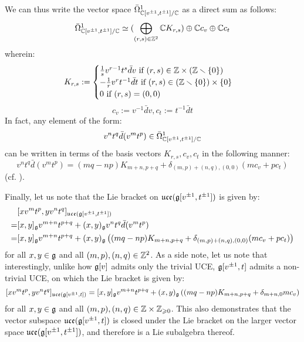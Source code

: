 \begin{example}
            We can thus write the vector space $\bar{\Omega}^1_{\mathbb{C}[v^{\pm 1}, t^{\pm 1}]/\mathbb{C}}$ as a direct sum as follows:
                $$\bar{\Omega}^1_{\mathbb{C}[v^{\pm 1}, t^{\pm 1}]/\mathbb{C}} \simeq ( \bigoplus_{(r, s) \in \mathbb{Z}^2} \mathbb{C} K_{r, s}) \oplus \mathbb{C} c_v \oplus \mathbb{C} c_t$$
            wherein:
                $$
                    K_{r, s} :=
                    \begin{cases}
                        \text{$\frac1s v^{r - 1} t^s \bar{d}v$ if $(r, s) \in \Z \x (\Z \setminus \{0\})$}
                        \\
                        \text{$-\frac1r v^r t^{-1} \bar{d}t$ if $(r, s) \in (\Z \setminus \{0\}) \x \{0\}$}
                        \\
                        \text{$0$ if $(r, s) = (0, 0)$}
                    \end{cases}
                $$
                $$c_v := v^{-1} \bar{d}v, c_t := t^{-1} \bar{d}t$$
            In fact, any element of the form:
                $$v^n t^q \bar{d}(v^m t^p) \in \bar{\Omega}^1_{\mathbb{C}[v^{\pm 1}, t^{\pm 1}]/\mathbb{C}}$$
            can be written in terms of the basis vectors $K_{r, s}, c_v, c_t$ in the following manner:
                $$v^n t^q \bar{d}(v^m t^p) = (mq - np) K_{m + n, p + q} + \delta_{(m, p) + (n, q), (0, 0)} ( m c_v + p c_t )$$
            (cf. \cite[p. 35]{wendlandt_formal_shift_operators_on_yangian_doubles}).

            Finally, let us note that the Lie bracket on $\mathfrak{uce}(\mathfrak{g}[v^{\pm 1}, t^{\pm 1}])$ is given by:
                $$
                    \begin{aligned}
                        & [x v^m t^p, y v^n t^q]_{\mathfrak{uce}(\mathfrak{g}[v^{\pm 1}, t^{\pm 1}])}
                        \\
                        = & [x, y]_{\mathfrak{g}} v^{m + n} t^{p + q} + (x, y)_{\mathfrak{g}} v^n t^q \bar{d}(v^m t^p)
                        \\
                        = & [x, y]_{\mathfrak{g}} v^{m + n} t^{p + q} + (x, y)_{\mathfrak{g}} \left( (mq - np) K_{m + n, p + q} + \delta_{(m, p) + (n, q), (0, 0)} ( m c_v + p c_t ) \right)
                    \end{aligned}
                $$
            for all $x, y \in \mathfrak{g}$ and all $(m, p), (n, q) \in \mathbb{Z}^2$. As a side note, let us note that interestingly, unlike how $\mathfrak{g}[v]$ admits only the trivial UCE, $\mathfrak{g}[v^{\pm 1}, t]$ admits a non-trivial UCE, on which the Lie bracket is given by:
                $$[x v^m t^p, y v^n t^q]_{\mathfrak{uce}(\mathfrak{g}[v^{\pm 1}, t])} = [x, y]_{\mathfrak{g}} v^{m + n} t^{p + q} + (x, y)_{\mathfrak{g}} \left( (mq - np) K_{m + n, p + q} + \delta_{m + n, 0} m c_v \right)$$
            for all $x, y \in \mathfrak{g}$ and all $(m, p), (n, q) \in \Z \x \Z_{\geq 0}$. This also demonstrates that the vector subspace $\mathfrak{uce}(\mathfrak{g}[v^{\pm 1}, t])$ is closed under the Lie bracket on the larger vector space $\mathfrak{uce}(\mathfrak{g}[v^{\pm 1}, t^{\pm 1}])$, and therefore is a Lie subalgebra thereof.
        \end{example}
